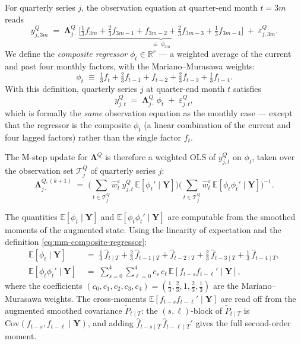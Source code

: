 \documentclass[11pt, a4paper, oneside]{article}
\newcommand{\mY}{\mathbf{Y}}
\newcommand{\mL}{\boldsymbol{\Lambda}}
\begin{document}
For quarterly series $j$, the observation equation at quarter-end
month $t = 3m$ reads
\[
y^Q_{j, 3m} \;=\; \mL^Q_{j \cdot}\, \underbrace{\big[\tfrac{1}{3} f_{3m} + \tfrac{2}{3} f_{3m-1} + f_{3m-2} + \tfrac{2}{3} f_{3m-3} + \tfrac{1}{3} f_{3m-4}\big]}_{\equiv\; \phi_{3m}} \;+\; \varepsilon^Q_{j, 3m}.
\]
We define the \emph{composite regressor} $\phi_t \in \mathbb{R}^r$ —
a weighted average of the current and past four monthly factors, with
the Mariano–Murasawa weights:
\begin{equation}
\phi_t \;\equiv\; \tfrac{1}{3} f_t + \tfrac{2}{3} f_{t-1} + f_{t-2} + \tfrac{2}{3} f_{t-3} + \tfrac{1}{3} f_{t-4}.
\label{eq:mm-composite-regressor}
\end{equation}
With this definition, quarterly series $j$ at quarter-end month $t$
satisfies
\[
y^Q_{j, t} \;=\; \mL^Q_{j \cdot}\, \phi_t \;+\; \varepsilon^Q_{j, t},
\]
which is formally the \emph{same} observation equation as the monthly
case — except that the regressor is the composite $\phi_t$ (a linear
combination of the current and four lagged factors) rather than the
single factor $f_t$.

The M-step update for $\mL^Q$ is therefore a weighted OLS of
$y^Q_{j, t}$ on $\phi_t$, taken over the observation set
$\mathcal{T}^Q_j$ of quarterly series $j$:
\begin{equation}
\boxed{\;\;
\mL^{Q,(k+1)}_{j \cdot} \;=\;
\Big(\sum_{t \in \mathcal{T}^Q_j} \hat{w}^\varepsilon_t\, y^Q_{j,t}\, \mathbb{E}[\phi_t' \mid \mY]\Big)
\Big(\sum_{t \in \mathcal{T}^Q_j} \hat{w}^\varepsilon_t\, \mathbb{E}[\phi_t \phi_t' \mid \mY]\Big)^{-1}.
\;\;}
\label{eq:mm-LambdaQ-update}
\end{equation}

The quantities $\mathbb{E}[\phi_t \mid \mY]$ and
$\mathbb{E}[\phi_t \phi_t' \mid \mY]$ are computable from the smoothed
moments of the augmented state. Using the linearity of expectation
and the definition \eqref{eq:mm-composite-regressor}:
\begin{align}
\mathbb{E}[\phi_t \mid \mY] \;&=\; \tfrac{1}{3}\,\hat{f}_{t \mid T} + \tfrac{2}{3}\,\hat{f}_{t-1 \mid T} + \hat{f}_{t-2 \mid T} + \tfrac{2}{3}\,\hat{f}_{t-3 \mid T} + \tfrac{1}{3}\,\hat{f}_{t-4 \mid T},
\label{eq:mm-Ephi}\\[4pt]
\mathbb{E}[\phi_t \phi_t' \mid \mY] \;&=\; \sum_{s=0}^{4}\sum_{\ell=0}^{4} c_s\, c_\ell\, \mathbb{E}[f_{t-s} f_{t-\ell}' \mid \mY],
\label{eq:mm-Ephiphi}
\end{align}
where the coefficients $(c_0, c_1, c_2, c_3, c_4) = (\tfrac{1}{3}, \tfrac{2}{3}, 1, \tfrac{2}{3}, \tfrac{1}{3})$
are the Mariano–Murasawa weights. The cross-moments
$\mathbb{E}[f_{t-s} f_{t-\ell}' \mid \mY]$ are read off from the
augmented smoothed covariance $\tilde{P}_{t \mid T}$: the
$(s, \ell)$-block of $\tilde{P}_{t \mid T}$ is
$\mathrm{Cov}(f_{t-s}, f_{t-\ell} \mid \mY)$, and adding
$\hat{f}_{t-s \mid T}\, \hat{f}_{t-\ell \mid T}'$ gives the full
second-order moment.
\end{document}
